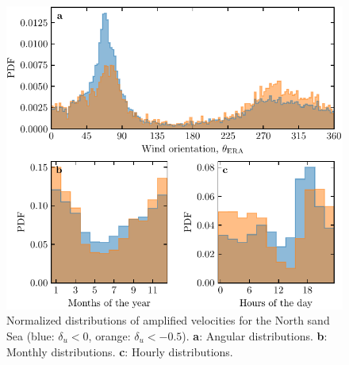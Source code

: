 \begin{figure}[p]
\centering
\includegraphics[scale=1]{Figures/Figure12_supp.pdf}
\caption{Normalized distributions of amplified velocities for the North sand Sea (blue: $\delta_u < 0$, orange: $\delta_u < -0.5$). \textbf{a}: Angular distributions. \textbf{b}: Monthly distributions. \textbf{c}: Hourly distributions.}
\label{Fig12_supp}
\end{figure}

